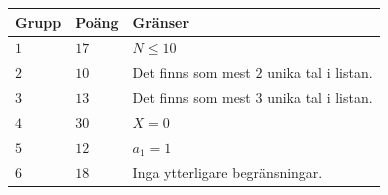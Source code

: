 \noindent
\begin{tabular}{| l | l | p{12cm} |}
  \hline
  \textbf{Grupp} & \textbf{Poäng} & \textbf{Gränser} \\ \hline
  $1$    & $17$       & $N \leq 10$ \\ \hline
  $2$    & $10$       & Det finns som mest $2$ unika tal i listan. \\ \hline
  $3$    & $13$       & Det finns som mest $3$ unika tal i listan. \\ \hline
  $4$    & $30$       & $X = 0$ \\ \hline
  $5$    & $12$       & $a_1 = 1$ \\ \hline
  $6$    & $18$       & Inga ytterligare begränsningar. \\ \hline
\end{tabular}
